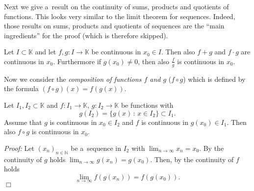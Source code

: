 Next we give a~result on the continuity of sums, products and quotients of functions. This looks very similar to the limit theorem for sequences. Indeed, those results on sums, products and quotients of sequences are the ``main ingredients'' for the proof (which is therefore skipped).

\begin{Theorem}\label{eq:sumscont}
Let $I\subset \mathbb{K}$ and let $f,g:I\to\mathbb{K}$ be continuous in $x_0\in I$. Then also $f+ g$ and $f\cdot g$ are continuous in $x_0$. Furthermore if $g(x_0)\neq0$, then also $\frac{f}g$ is continuous in $x_0$.
\end{Theorem}
Now we consider the {\em composition of functions  $f$ and $g$} ($f\circ g$) which is defined by the formula $(f\circ g)(x)=f(g(x))$.

\begin{Theorem}
Let $I_1,I_2\subset\mathbb{K}$ and $f:I_1\to\mathbb{K}$, $g:I_2\to\mathbb{K}$ be functions with \[g(I_2)=\{g(x)\,:\,x\in I_2\}\subset I_1.\] Assume that $g$ is continuous in $x_0\in I_2$ and $f$ is continuous in $g(x_0)\in I_1$. Then also $f\circ g$ is continuous in $x_0$.
\end{Theorem}
{\em Proof:} Let $(x_n)_{n\in\mathbb{N}}$ be a~sequence in $I_2$ with $\lim_{n\to\infty}x_n=x_0$. By the continuity of $g$ holds $\lim_{n\to\infty}g(x_n)=g(x_0)$.  Then,
by the continuity of $f$ holds \[\lim_{n\to\infty}f(g(x_n))=f(g(x_0)).\] \hfill$\Box$

